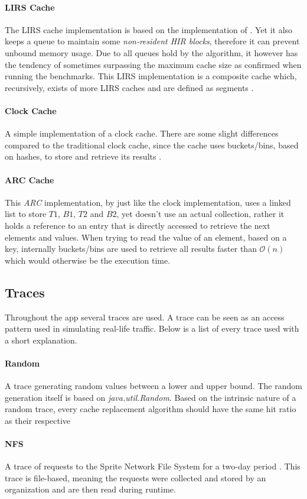 \documentclass[pdftex,a4paper,12pt,twoside]{report}
\begin{document}
\paragraph{LIRS Cache} The LIRS cache implementation is based on the implementation of \cite{jiang2002lirs}. Yet it also keeps a queue to maintain some \emph{non-resident HIR blocks}, therefore it can prevent unbound memory usage. Due to all queues hold by the algorithm, it however has the tendency of sometimes surpassing the maximum cache size as confirmed when running the benchmarks. This LIRS implementation is a composite cache which, recursively, exists of more LIRS caches and are defined as segments \citep{cachelirs_oak}.
\paragraph{Clock Cache} A simple implementation of a clock cache. There are some slight differences compared to the traditional clock cache, since the cache uses buckets/bins, based on hashes, to store and retrieve its results \citep{cache2k_clock}.
\paragraph{ARC Cache} This \emph{ARC} implementation, by \cite{cache2k_arc} just like the clock implementation, uses a linked list to store $T1$, $B1$, $T2$ and $B2$, yet doesn't use an actual collection, rather it holds a reference to an entry that is directly accessed to retrieve the next elements and values. When trying to read the value of an element, based on a key, internally buckets/bins are used to retrieve all results faster than $\mathcal{O}(n)$ which would otherwise be the execution time.
\subsection{Traces}
\label{sec:traces}
Throughout the app several traces are used. A trace can be seen as an access pattern used in simulating real-life traffic. Below is a list of every trace used with a short explanation.
\paragraph{Random} A trace generating random values between a lower and upper bound. The random generation itself is based on \emph{java.util.Random}. Based on the intrinsic nature of a random trace, every cache replacement algorithm should have the same hit ratio as their respective 
\paragraph{NFS} A trace of requests to the Sprite Network File System for a two-day period \citep{jiang2005clock}. This trace is file-based, meaning the requests were collected and stored by an organization and are then read during runtime.
\end{document}
